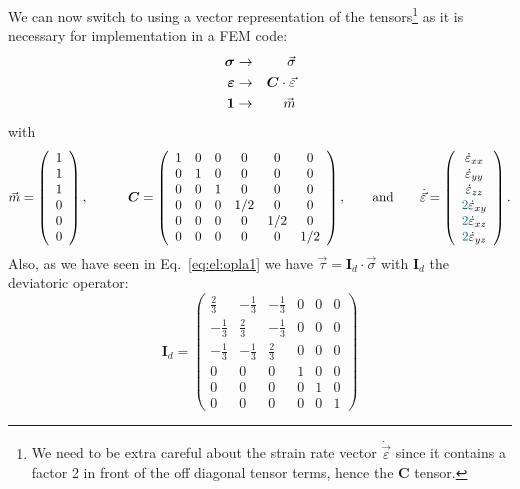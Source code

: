 We can now switch to using a vector representation of the tensors\footnote{We need to be extra careful about the strain rate vector $\dot{\vec{\varepsilon}}$ since it contains a factor 2 in front of the off diagonal tensor terms, hence the ${\bm C}$ tensor.} as it is necessary for implementation in a FEM code:
\begin{eqnarray}
{\bm \sigma} &\rightarrow& \vec{\sigma} \nonumber\\
{\bm \varepsilon} &\rightarrow& {\bm C} \cdot \vec{\varepsilon} \nonumber\\
{\bm 1} &\rightarrow& \vec{m} \nonumber
\end{eqnarray}
with 
\[
\vec{m}=
\left(
\begin{array}{c}
1 \\ 1 \\ 1 \\ 0 \\ 0 \\ 0
\end{array}
\right),
\qquad\quad
{\bm C}=
\left(
\begin{array}{cccccc}
1 & 0 & 0 & 0 & 0 & 0 \\
0 & 1 & 0 & 0 & 0 & 0 \\
0 & 0 & 1 & 0 & 0 & 0 \\
0 & 0 & 0 & 1/2 & 0 & 0 \\
0 & 0 & 0 & 0 & 1/2 & 0 \\
0 & 0 & 0 & 0 & 0 & 1/2 
\end{array}
\right),
\qquad
{\rm and} 
\qquad
\dot{\vec{\varepsilon}}=
\left(
\begin{array}{c}
\dot\varepsilon_{xx}\\ 
\dot\varepsilon_{yy}\\ 
\dot\varepsilon_{zz}\\ 
{\color{teal}2}\dot\varepsilon_{xy} \\ 
{\color{teal}2}\dot\varepsilon_{xz} \\ 
{\color{teal}2}\dot\varepsilon_{yz}
\end{array}
\right).
\]
Also, as we have seen in Eq.~\eqref{eq:el:opla1} we have
$\vec\tau = {\bm I}_d \cdot \vec\sigma$
with ${\bm I}_d$ the deviatoric operator:
\[
{\bm I}_d=
\left(
\begin{array}{cccccc}
\frac23 & - \frac13 & - \frac13 & 0 & 0 & 0 \\
-\frac13 & \frac23 & - \frac13  & 0 & 0 & 0\\
-\frac13& - \frac13 & \frac23  & 0 & 0 & 0\\
0&0&0& 1&0 &0  \\
0&0&0&0&1 &0\\
0&0&0&0&0& 1
\end{array}
\right)
\]
